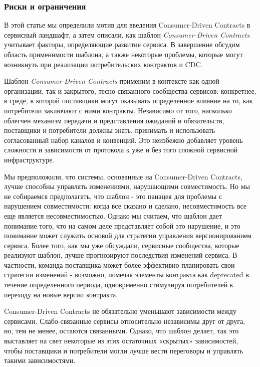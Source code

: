 \documentclass[11pt]{article}
\begin{document}
\subsubsection{Риски и
ограничения}\label{ux440ux438ux441ux43aux438-ux438-ux43eux433ux440ux430ux43dux438ux447ux435ux43dux438ux44f}

В этой статье мы определили мотив для введения Consumer-Driven Contracts
в сервисный ландшафт, а затем описали, как шаблон \emph{Consumer-Driven
Contracts} учитывает факторы, определяющие развитие сервиса. В
завершение обсудим область применимости шаблона, а также некоторые
проблемы, которые могут возникнуть при реализации потребительских
контрактов и CDC.

Шаблон \emph{Consumer-Driven Contracts} применим в контексте как одной
организации, так и закрытого, тесно связанного сообщества сервисов:
конкретнее, в среде, в которой поставщики могут оказывать определенное
влияние на то, как потребители заключают с ними контракты. Независимо от
того, насколько облегчен механизм передачи и представления ожиданий и
обязательств, поставщики и потребители должны знать, принимать и
использовать согласованный набор каналов и конвенций. Это неизбежно
добавляет уровень сложности и зависимости от протокола к уже и без того
сложной сервисной инфраструктуре.

Мы предположили, что системы, основанные на Consumer-Driven Contracts,
лучше способны управлять изменениями, нарушающими совместимость. Но мы
не собираемся предполагать, что шаблон - это панацея для проблемы с
нарушением совместимости: когда все сказано и сделано, несовместимость
все еще является несовместимостью. Однако мы считаем, что шаблон дает
понимание того, что на самом деле представляет собой это нарушение, и
это понимание может служить основой для стратегии управления
версионированием сервиса. Более того, как мы уже обсуждали, сервисные
сообщества, которые реализуют шаблон, лучше прогнозируют последствия
изменений сервиса. В частности, команда поставщика может более
эффективно планировать свои стратегии изменений - возможно, помечая
элементы контракта как deprecated в течение определенного периода,
одновременно стимулируя потребителей к переходу на новые версии
контракта.

Consumer-Driven Contracts не обязательно уменьшают зависимости между
сервисами. Слабо-связанные сервисы относительно независимы друг от
друга, но, тем не менее, остаются связанными. Однако, что шаблон делает,
так это выставляет на свет некоторые из этих остаточных «скрытых»
зависимостей, чтобы поставщики и потребители могли лучше вести
переговоры и управлять такими зависимостями.
\end{document}
